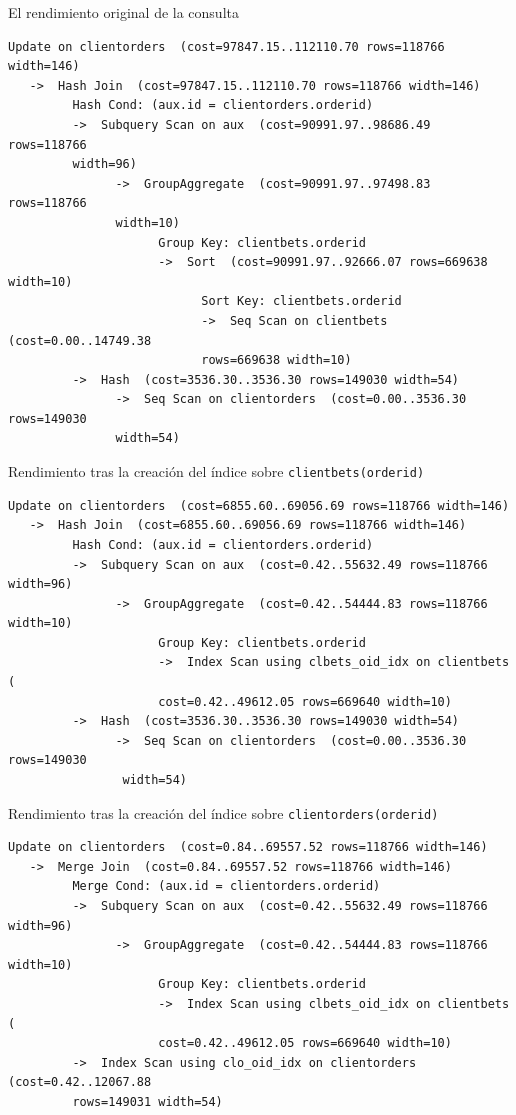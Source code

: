 \documentclass{article}
\begin{document}
El rendimiento original de la consulta
\lstset{basicstyle=\small,style=sql}
\begin{lstlisting}[style=sql]
 Update on clientorders  (cost=97847.15..112110.70 rows=118766 width=146)
   ->  Hash Join  (cost=97847.15..112110.70 rows=118766 width=146)
         Hash Cond: (aux.id = clientorders.orderid)
         ->  Subquery Scan on aux  (cost=90991.97..98686.49 rows=118766 
         width=96)
               ->  GroupAggregate  (cost=90991.97..97498.83 rows=118766 
               width=10)
                     Group Key: clientbets.orderid
                     ->  Sort  (cost=90991.97..92666.07 rows=669638 width=10)
                           Sort Key: clientbets.orderid
                           ->  Seq Scan on clientbets  (cost=0.00..14749.38 
                           rows=669638 width=10)
         ->  Hash  (cost=3536.30..3536.30 rows=149030 width=54)
               ->  Seq Scan on clientorders  (cost=0.00..3536.30 rows=149030 
               width=54)

\end{lstlisting}

Rendimiento tras la creación del índice sobre \texttt{clientbets(orderid)}
\begin{lstlisting}[style=sql]
 Update on clientorders  (cost=6855.60..69056.69 rows=118766 width=146)
   ->  Hash Join  (cost=6855.60..69056.69 rows=118766 width=146)
         Hash Cond: (aux.id = clientorders.orderid)
         ->  Subquery Scan on aux  (cost=0.42..55632.49 rows=118766 width=96)
               ->  GroupAggregate  (cost=0.42..54444.83 rows=118766 width=10)
                     Group Key: clientbets.orderid
                     ->  Index Scan using clbets_oid_idx on clientbets  (
                     cost=0.42..49612.05 rows=669640 width=10)
         ->  Hash  (cost=3536.30..3536.30 rows=149030 width=54)
               ->  Seq Scan on clientorders  (cost=0.00..3536.30 rows=149030
                width=54)
\end{lstlisting}

Rendimiento tras la creación del índice sobre \texttt{clientorders(orderid)}
\begin{lstlisting}[style=sql]
 Update on clientorders  (cost=0.84..69557.52 rows=118766 width=146)
   ->  Merge Join  (cost=0.84..69557.52 rows=118766 width=146)
         Merge Cond: (aux.id = clientorders.orderid)
         ->  Subquery Scan on aux  (cost=0.42..55632.49 rows=118766 width=96)
               ->  GroupAggregate  (cost=0.42..54444.83 rows=118766 width=10)
                     Group Key: clientbets.orderid
                     ->  Index Scan using clbets_oid_idx on clientbets  (
                     cost=0.42..49612.05 rows=669640 width=10)
         ->  Index Scan using clo_oid_idx on clientorders  (cost=0.42..12067.88 
         rows=149031 width=54)

\end{lstlisting}
\end{document}
